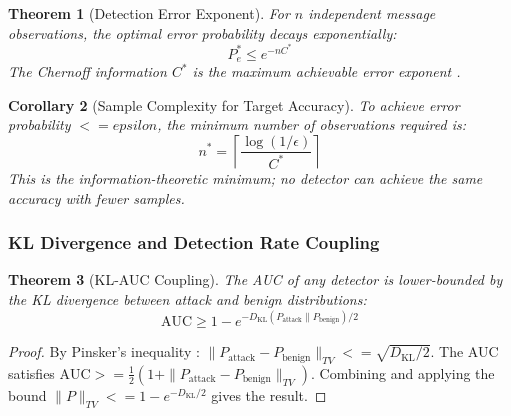 \documentclass[
]{article}
\newtheorem{theorem}{Theorem}[section]
\newtheorem{corollary}[theorem]{Corollary}
\begin{document}
\begin{theorem}[Detection Error Exponent]
\label{thm:error-exponent}
For $n$ independent message observations, the optimal error probability decays exponentially:
\begin{equation}
\label{eq:error-exponent}
P_e^* \leq e^{-n C^*}
\end{equation}
The Chernoff information $C^*$ is the maximum achievable error exponent \cite{chernoff1952measure}.
\end{theorem}

\begin{corollary}[Sample Complexity for Target Accuracy]
\label{cor:sample-complexity}
To achieve error probability $<= epsilon$, the minimum number of observations required is:
\begin{equation}
\label{eq:sample-complexity}
n^* = \left\lceil \frac{\log(1/\epsilon)}{C^*} \right\rceil
\end{equation}
This is the information-theoretic minimum; no detector can achieve the same accuracy with fewer samples.
\end{corollary}

\subsubsection{KL Divergence and Detection Rate
Coupling}\label{kl-divergence-and-detection-rate-coupling}

\begin{theorem}[KL-AUC Coupling]
\label{thm:kl-auc-coupling}
The AUC of any detector is lower-bounded by the KL divergence between attack and benign distributions:
\begin{equation}
\label{eq:kl-auc-coupling}
\text{AUC} \geq 1 - e^{-D_{\mathrm{KL}}(P_{\text{attack}} \| P_{\text{benign}})/2}
\end{equation}
\end{theorem}

\begin{proof}
By Pinsker's inequality \cite{cover2006elements}: $\| P_{\text{attack}} - P_{\text{benign}} \|_{TV} <= \sqrt{D_{\mathrm{KL}}/2}$. The AUC satisfies $\text{AUC} >= \frac{1}{2}(1 + \|P_{\text{attack}} - P_{\text{benign}}\|_{TV})$. Combining and applying the bound $\|P\|_{TV} <= 1 - e^{-D_{\mathrm{KL}}/2}$ gives the result.
\end{proof}
\end{document}
